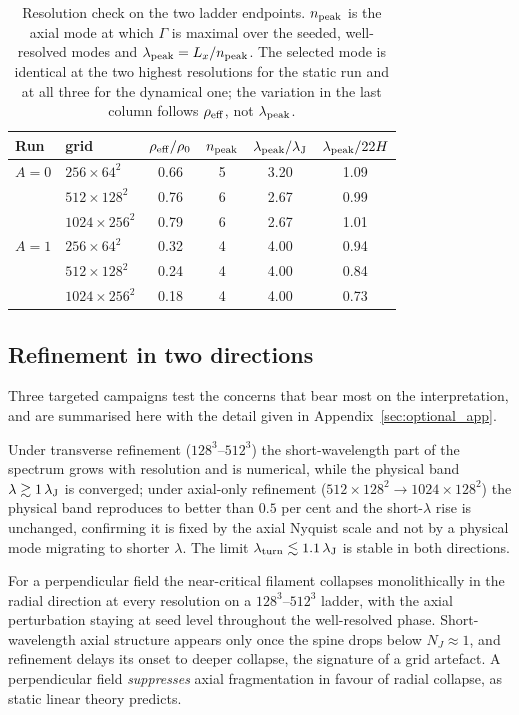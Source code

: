 \documentclass[usenatbib,twoside,twocolumn]{mnras}
\begin{document}
\begin{table}
\caption{Resolution check on the two ladder endpoints. $n_{\rm peak}$ is the axial mode at which $\Gamma$ is maximal over the seeded, well-resolved modes and $\lambda_{\rm peak}=L_x/n_{\rm peak}$. The selected mode is identical at the two highest resolutions for the static run and at all three for the dynamical one; the variation in the last column follows $\rho_{\rm eff}$, not $\lambda_{\rm peak}$.}
\label{tab:xlconv}
\footnotesize
\setlength{\tabcolsep}{4pt}
\begin{tabular}{llcccc}
\toprule
Run & grid & $\rho_{\rm eff}/\rho_0$ & $n_{\rm peak}$ & $\lambda_{\rm peak}/\lambda_{\rm J}$ & $\lambda_{\rm peak}/22H$ \\
\midrule
$A=0$ & $256\times64^2$   & 0.66 & 5 & 3.20 & 1.09 \\
      & $512\times128^2$  & 0.76 & 6 & 2.67 & 0.99 \\
      & $1024\times256^2$ & 0.79 & 6 & 2.67 & 1.01 \\
\midrule
$A=1$ & $256\times64^2$   & 0.32 & 4 & 4.00 & 0.94 \\
      & $512\times128^2$  & 0.24 & 4 & 4.00 & 0.84 \\
      & $1024\times256^2$ & 0.18 & 4 & 4.00 & 0.73 \\
\bottomrule
\end{tabular}
\end{table}

\subsection{Refinement in two directions}
\label{sec:optional_tests}

Three targeted campaigns test the concerns that bear most on the interpretation, and are summarised here with the detail given in Appendix~\ref{sec:optional_app}.

Under transverse refinement ($128^3$--$512^3$) the short-wavelength part of the spectrum grows with resolution and is numerical, while the physical band $\lambda\gtrsim1\,\lambda_{\rm J}$ is converged; under axial-only refinement ($512\times128^2\to1024\times128^2$) the physical band reproduces to better than $0.5$ per cent and the short-$\lambda$ rise is unchanged, confirming it is fixed by the axial Nyquist scale and not by a physical mode migrating to shorter $\lambda$. The limit $\lambda_{\rm turn}\lesssim1.1\,\lambda_{\rm J}$ is stable in both directions.

For a perpendicular field the near-critical filament collapses monolithically in the radial direction at every resolution on a $128^3$--$512^3$ ladder, with the axial perturbation staying at seed level throughout the well-resolved phase. Short-wavelength axial structure appears only once the spine drops below $N_J\approx1$, and refinement delays its onset to deeper collapse, the signature of a grid artefact. A perpendicular field \emph{suppresses} axial fragmentation in favour of radial collapse, as static linear theory predicts.
\end{document}

